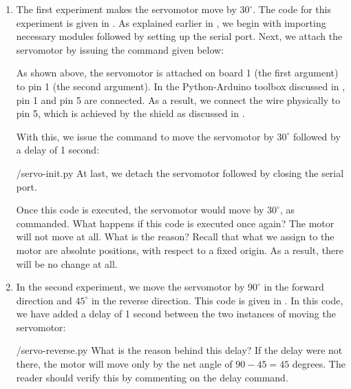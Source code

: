 \begin{enumerate}
  \item The first experiment makes the servomotor move by $30^\circ$. The code for this experiment is
        given in . As explained earlier in , 
        we begin with importing necessary modules followed by setting up the serial port.
        Next, we attach the servomotor by issuing the command given below:
        
        As shown above, the servomotor is attached on board 1 (the first argument)
        to pin 1 (the second argument).  In the Python-Arduino toolbox discussed 
        in , pin 1 and pin 5 are connected. As a result, we connect the wire physically to
        pin 5, which is achieved by the shield as discussed in .
        
        With this, we issue the command to move the servomotor by $30^\circ$ followed by a delay of 
        1 second:
        
        {\LocSERpycode/servo-init.py}
        At last, we  detach the servomotor followed by closing the serial port. 
        
        Once this code is executed, the servomotor would move by
        $30^\circ$, as commanded.  What happens if this code is executed
        once again?  The motor will not move at all.  What is the reason?
        Recall that what we assign to the motor are absolute positions, with
        respect to a fixed origin.  As a result, there will be no change at
        all. 
        
  \item In the second experiment, we move the servomotor by $90^\circ$ in the
        forward direction and $45^\circ$ in the reverse direction.  This
        code is given in .  In this code, 
        we have added a delay of 1 second between the two instances of 
        moving the servomotor: 
        
        {\LocSERpycode/servo-reverse.py}
        What is the reason behind this delay?  If the delay were not
        there, the motor will move only by the net angle of $90-45 = 45$
        degrees.  The reader should verify this by commenting on the delay
        command. 
        
        

\end{enumerate}
